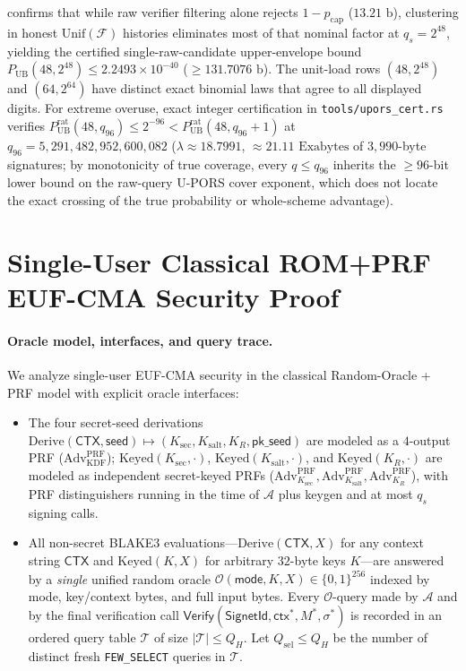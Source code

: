 \documentclass[11pt,a4paper]{article}
\theoremstyle{definition}
\theoremstyle{remark}
\newcommand{\UPORS}{\textsf{U-PORS}}
\newcommand{\BLAKE}{\textsf{BLAKE3}}
\newcommand{\Keyed}{\mathrm{Keyed}}
\newcommand{\Derive}{\mathrm{Derive}}
\newcommand{\Adv}{\mathrm{Adv}}
\newcommand{\bits}{\{0,1\}}
\newcommand{\Unif}{\mathrm{Unif}}
\newcommand{\calF}{\mathcal{F}}
\begin{document}
 confirms that while raw verifier filtering alone rejects $1 - p_{\mathrm{cap}}$ ($13.21\text{ b}$), clustering in honest $\Unif(\calF)$ histories eliminates most of that nominal factor at $q_s = 2^{48}$, yielding the certified single-raw-candidate upper-envelope bound $P_{\mathrm{UB}}(48, 2^{48}) \le 2.2493 \times 10^{-40}$ ($\ge 131.7076\text{ b}$). The unit-load rows $(48, 2^{48})$ and $(64, 2^{64})$ have distinct exact binomial laws that agree to all displayed digits. For extreme overuse, exact integer certification in \texttt{tools/upors\_cert.rs} verifies $P_{\mathrm{UB}}^{\mathrm{rat}}(48, q_{96}) \le 2^{-96} < P_{\mathrm{UB}}^{\mathrm{rat}}(48, q_{96}+1)$ at $q_{96} = 5{,}291{,}482{,}952{,}600{,}082$ ($\lambda \approx 18.7991$, $\approx 21.11\text{ Exabytes}$ of $3{,}990$-byte signatures; by monotonicity of true coverage, every $q \le q_{96}$ inherits the $\ge 96$-bit lower bound on the raw-query \UPORS{} cover exponent, which does not locate the exact crossing of the true probability or whole-scheme advantage).

\section{Single-User Classical ROM+PRF EUF-CMA Security Proof}
\label{sec:security}

\paragraph{Oracle model, interfaces, and query trace.}
We analyze single-user EUF-CMA security in the classical Random-Oracle + PRF model with explicit oracle interfaces:
\begin{itemize}[leftmargin=1.4em,itemsep=2pt]
  \item The four secret-seed derivations $\Derive(\mathsf{CTX}, \mathsf{seed}) \mapsto (K_{\mathrm{sec}}, K_{\mathrm{salt}}, K_R, \mathsf{pk\_seed})$ are modeled as a $4$-output PRF ($\Adv^{\mathrm{PRF}}_{\mathrm{KDF}}$); $\Keyed(K_{\mathrm{sec}}, \cdot)$, $\Keyed(K_{\mathrm{salt}}, \cdot)$, and $\Keyed(K_R, \cdot)$ are modeled as independent secret-keyed PRFs ($\Adv^{\mathrm{PRF}}_{K_{\mathrm{sec}}}, \Adv^{\mathrm{PRF}}_{K_{\mathrm{salt}}}, \Adv^{\mathrm{PRF}}_{K_R}$), with PRF distinguishers running in the time of $\mathcal{A}$ plus keygen and at most $q_s$ signing calls.
  \item All non-secret \BLAKE{} evaluations---$\Derive(\mathsf{CTX}, X)$ for any context string $\mathsf{CTX}$ and $\Keyed(K, X)$ for arbitrary $32$-byte keys $K$---are answered by a \emph{single} unified random oracle $\mathcal{O}(\mathsf{mode}, K, X) \in \bits^{256}$ indexed by mode, key/context bytes, and full input bytes. Every $\mathcal{O}$-query made by $\mathcal{A}$ and by the final verification call $\mathsf{Verify}(\mathsf{SignetId}, \mathsf{ctx}^*, M^*, \sigma^*)$ is recorded in an ordered query table $\mathcal{T}$ of size $|\mathcal{T}| \le Q_H$. Let $Q_{\mathrm{sel}} \le Q_H$ be the number of distinct fresh \texttt{FEW\_SELECT} queries in $\mathcal{T}$.
\end{itemize}
\end{document}
